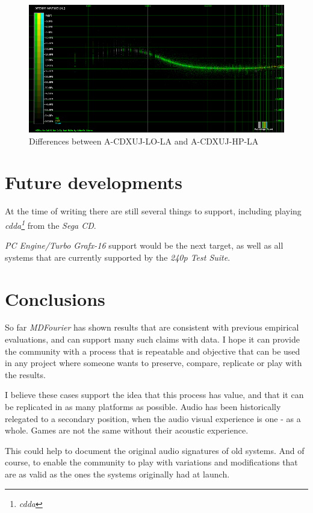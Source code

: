 \documentclass[10pt,a4paper]{report}
\newcommand{\define}[1]{\textit{\acrshort{#1}\footnote{\textit{\acrlong{#1}}}}}
\begin{document}
\begin{figure}[H]
	\centering
	\includegraphics[width=1.0\linewidth]{images/results/8-A-CDXUJ-LO_LA_vs_A-CDXUJ-HP_LA.png}
	\caption[A-CDXUJ-LO-LA vs A-CDXUJ-HP-LA]{Differences between A-CDXUJ-LO-LA and A-CDXUJ-HP-LA}
	\label{fig:A-CDXUJ-LO_LA_vs_A-CDXUJ-HP_LA}
\end{figure}

\chapter{Future developments}

At the time of writing there are still several things to support, including playing \define{cdda} from the \textit{Sega CD}.

\textit{PC Engine/Turbo Grafx-16} support would be the next target, as well as all systems that are currently supported by the \textit{240p Test Suite}.

\chapter{Conclusions}

So far \textit{MDFourier} has shown results that are consistent with previous empirical evaluations, and can support many such claims with data. I hope it can provide the community with a process that is repeatable and objective that can be used in any project where someone wants to preserve, compare, replicate or play with the results.

I believe these cases support the idea that this process has value, and that it can be replicated in as many platforms as possible. Audio has been historically relegated to a secondary position, when the audio visual experience is one - as a whole. Games are not the same without their acoustic experience.

This could help to document the original audio signatures of old systems. And of course, to enable the community to play with variations and modifications that are as valid as the ones the systems originally had at launch.
\end{document}
